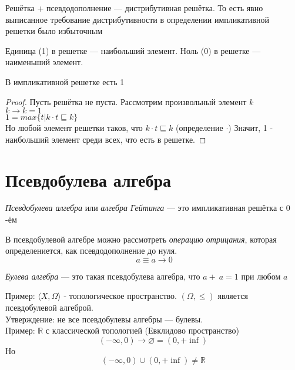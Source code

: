 \begin{theorem}
	Решётка + псевдодополнение --- дистрибутивная решётка. То есть явно выписанное требование дистрибутивности в определении импликативной решетки было избыточным
\end{theorem}

\begin{definition} 
	Единица (1) в решетке --- наибольший элемент. 
	Ноль (0) в решетке --- наименьший элемент. 
\end{definition}

\begin{theorem}
	В импликативной решетке есть 1
\end{theorem}
\begin{proof}
	Пусть решётка не пуста. Рассмотрим произвольный элемент $k$ \\
	$k \to k = 1$ \\
	$1 = max \{t | k \cdot t \sqsubseteq k \} $ \\
	Но любой элемент решетки таков, что  $k \cdot t \sqsubseteq k$ (определение $\cdot$)
	Значит, 1 - наибольший элемент среди всех, что есть в решетке.
\end{proof}


\section{Псевдобулева алгебра}
\begin{definition}
	\emph{Псевдобулева алгебра} или \emph{алгебра Гейтинга} --- это импликативная решётка с $0$-ём
\end{definition}
В псевдобулевой алгебре можно рассмотреть \emph{операцию отрицания}, которая определениется, как псевдодополнение до нуля.
$$~a \equiv	a \to 0$$

\begin{definition}
	\emph{Булева алгебра} --- это такая псевдобулева алгебра, что $ a + ~a = 1$ при любом $a$
\end{definition}
Пример:  $\langle{}X, \Omega \rangle$ - топологическое пространство. $(\Omega, \leq)$ является псевдобулевой алгеброй. \\
Утверждение: не все псевдобулевы алгебры --- булевы. \\
Пример: $\mathbb{R}$ с классической топологией (Евклидово пространство)
$$(-\infty,0) \to \varnothing = (0, +\inf)$$
Но $$(-\infty,0) \cup  (0, +\inf) \ne \mathbb{R}$$

